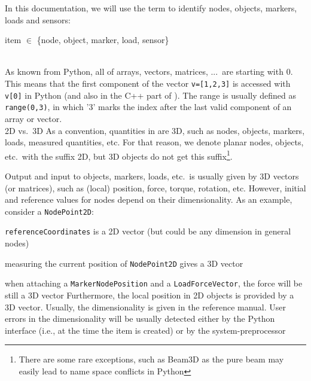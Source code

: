 In this documentation, we will use the term  to identify nodes, objects, markers, loads and sensors: \vspace{6pt}

  item $\in$ \{node, object, marker, load, sensor\} \vspace{12pt}

\noindent {} \vspace{6pt}\\
As known from Python, all  of arrays, vectors, matrices, ...\ are starting with 0. This means that the first component of the vector \texttt{v=[1,2,3]} is accessed with \texttt{v[0]} in Python (and also in the C++ part of \codeName ). The range is usually defined as \texttt{range(0,3)}, in which '3' marks the index after the last valid component of an array or vector.
\ignoreRST{\vspace{12pt}\\}
%
 \ignoreRST{\vspace{6pt}}\\ 
\ac{2D} vs.\ \ac{3D}
\ignoreRST{\vspace{6pt}\\}
As a convention, quantities in \codeName are 3D, such as nodes, objects, markers, loads, measured quantities, etc. 
For that reason, we denote planar nodes, objects, etc.\ with the suffix 2D, but 3D objects do not get this suffix\footnote{There are some rare exceptions, such as Beam3D as the pure beam may easily lead to name space conflicts in Python}.

Output and input to objects, markers, loads, etc.\ is usually given by 3D vectors (or matrices), such as (local) position, force, torque, rotation, etc. However, initial and reference values for nodes depend on their dimensionality.
As an example, consider a \texttt{NodePoint2D}:
\bi
  \item \texttt{referenceCoordinates} is a 2D vector (but could be any dimension in general nodes)
  \item measuring the current position of \texttt{NodePoint2D} gives a 3D vector
  \item when attaching a \texttt{MarkerNodePosition} and a \texttt{LoadForceVector}, the force will be still a 3D vector
\ei
Furthermore, the local position in 2D objects is provided by a 3D vector. Usually, the dimensionality is given in the reference manual. User errors in the dimensionality will be usually detected either by the Python interface (i.e., at the time the item is created) or by the system-preprocessor

